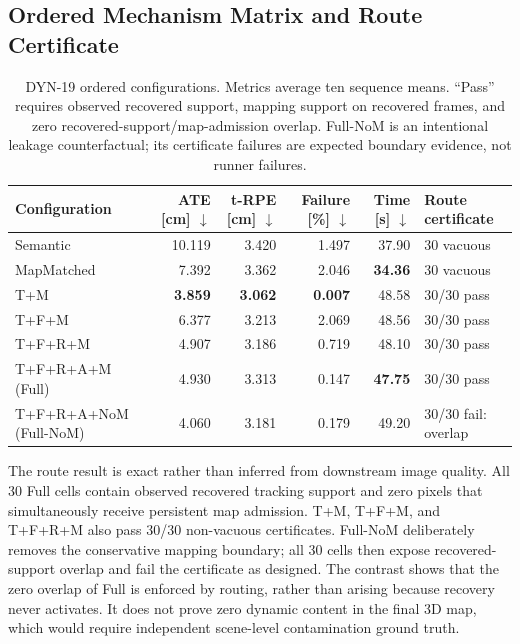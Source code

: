 \subsection{Ordered Mechanism Matrix and Route Certificate}

\begin{table}[t]
\centering
\caption{DYN-19 ordered configurations. Metrics average ten sequence means. ``Pass'' requires observed recovered support, mapping support on recovered frames, and zero recovered-support/map-admission overlap. Full-NoM is an intentional leakage counterfactual; its certificate failures are expected boundary evidence, not runner failures.}
\label{tab:dyn19-ablation}
\footnotesize
\begin{tabular}{lrrrrl}
\toprule
Configuration & ATE [cm] $\downarrow$ & t-RPE [cm] $\downarrow$ & Failure [\%] $\downarrow$ & Time [s] $\downarrow$ & Route certificate \\
\midrule
Semantic & 10.119 & 3.420 & 1.497 & 37.90 & 30 vacuous \\
MapMatched & 7.392 & 3.362 & 2.046 & \textbf{34.36} & 30 vacuous \\
T+M & \textbf{3.859} & \textbf{3.062} & \textbf{0.007} & 48.58 & 30/30 pass \\
T+F+M & 6.377 & 3.213 & 2.069 & 48.56 & 30/30 pass \\
T+F+R+M & 4.907 & 3.186 & 0.719 & 48.10 & 30/30 pass \\
T+F+R+A+M (Full) & 4.930 & 3.313 & 0.147 & \textbf{47.75} & 30/30 pass \\
T+F+R+A+NoM (Full-NoM) & 4.060 & 3.181 & 0.179 & 49.20 & 30/30 fail: overlap \\
\bottomrule
\end{tabular}
\end{table}

The route result is exact rather than inferred from downstream image quality.
All 30 Full cells contain observed recovered tracking support and zero pixels that simultaneously receive persistent map admission.
T+M, T+F+M, and T+F+R+M also pass 30/30 non-vacuous certificates.
Full-NoM deliberately removes the conservative mapping boundary; all 30 cells then expose recovered-support overlap and fail the certificate as designed.
The contrast shows that the zero overlap of Full is enforced by routing, rather than arising because recovery never activates.
It does not prove zero dynamic content in the final 3D map, which would require independent scene-level contamination ground truth.

